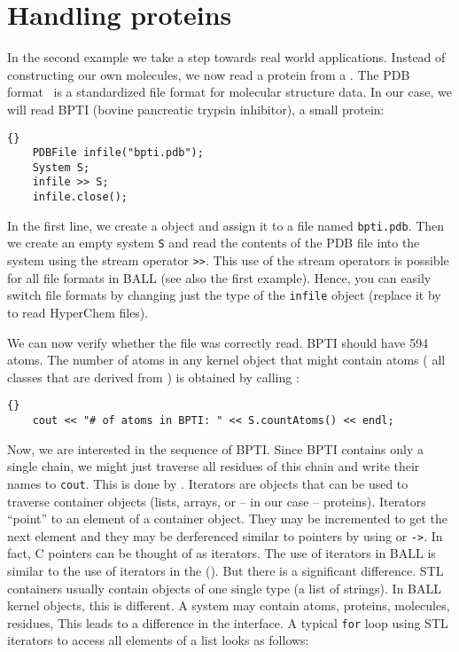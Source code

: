 \section{Handling proteins}

In the second example we take a step towards real world applications. Instead
of constructing our own molecules, we now read a protein from a . The PDB format~\cite{PDB} is a standardized file format for molecular structure
data. In our case, we will read BPTI (bovine pancreatic trypsin inhibitor), a
small protein:

\begin{lstlisting}{}
	PDBFile infile("bpti.pdb");
	System S;
	infile >> S;
	infile.close();
\end{lstlisting}

\noindent
In the first line, we create a  object and assign it to a file
named {\tt bpti.pdb}. Then we create an empty system {\tt S} and read the
contents of the PDB file into the system using the stream operator {\tt >>}.
This use of the stream operators is possible for all file formats in BALL (see
also the first example). Hence, you can easily switch file formats
by changing just the type of the {\tt infile} object (\eg replace it by
 to read HyperChem files).

We can now verify whether the file was correctly read. BPTI should have 594
atoms. The number of atoms in any kernel object that might contain atoms (\ie
all classes that are derived from ) is obtained by calling
:

\begin{lstlisting}{}
	cout << "# of atoms in BPTI: " << S.countAtoms() << endl;
\end{lstlisting}

Now, we are interested in the sequence of BPTI. Since BPTI contains only a
single chain, we might just traverse all residues of this chain and write
their names to {\tt cout}. This is done by . Iterators are
objects that can be used to traverse container objects (\eg lists, arrays, or
-- in our case -- proteins). Iterators ``point'' to an element of a container
object. They may be incremented to get the next element and they may be
derferenced similar to pointers by using {\tt *} or {\tt ->}. In fact,
C pointers can be thought of as iterators.
The use of iterators in BALL is similar to the
use of iterators in the  ().
But there is a significant difference. STL containers usually contain objects of
one single type (\eg a list of strings). In BALL kernel objects, this is
different. A system may contain atoms, proteins, molecules, residues, \etc
This leads to a difference in the interface. A typical {\tt for} loop using STL
iterators to access all elements of a list looks as follows:

